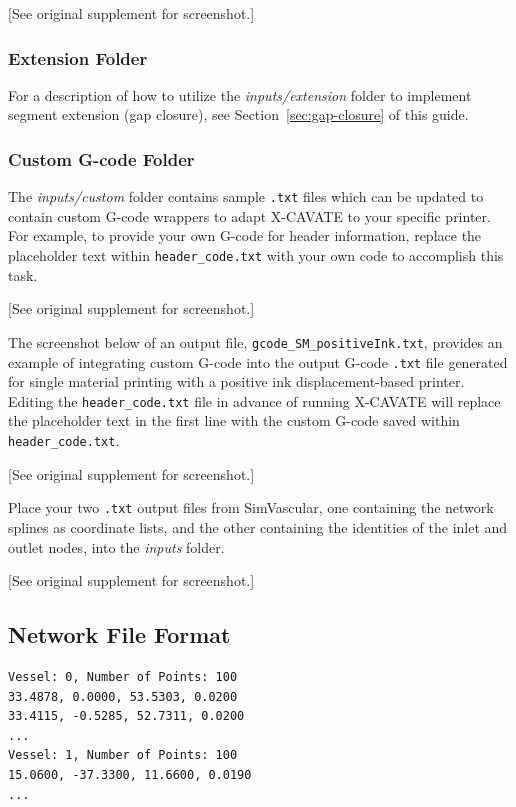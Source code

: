 \documentclass[11pt,letterpaper]{article}
\newcommand{\code}[1]{\texttt{#1}}
\begin{document}
[See original supplement for screenshot.]

\subsubsection{Extension Folder}

For a description of how to utilize the \textit{inputs/extension} folder to
implement segment extension (gap closure), see Section~\ref{sec:gap-closure}
of this guide.

\subsubsection{Custom G-code Folder}

The \textit{inputs/custom} folder contains sample \code{.txt} files which can
be updated to contain custom G-code wrappers to adapt X-CAVATE to your
specific printer. For example, to provide your own G-code for header
information, replace the placeholder text within \code{header\_code.txt} with
your own code to accomplish this task.

[See original supplement for screenshot.]

The screenshot below of an output file, \code{gcode\_SM\_positiveInk.txt},
provides an example of integrating custom G-code into the output G-code
\code{.txt} file generated for single material printing with a positive ink
displacement-based printer. Editing the \code{header\_code.txt} file in
advance of running X-CAVATE will replace the placeholder text in the first
line with the custom G-code saved within \code{header\_code.txt}.

[See original supplement for screenshot.]

Place your two \code{.txt} output files from SimVascular, one containing the
network splines as coordinate lists, and the other containing the identities of
the inlet and outlet nodes, into the \textit{inputs} folder.

[See original supplement for screenshot.]

\subsection{Network File Format}

\begin{lstlisting}
Vessel: 0, Number of Points: 100
33.4878, 0.0000, 53.5303, 0.0200
33.4115, -0.5285, 52.7311, 0.0200
...
Vessel: 1, Number of Points: 100
15.0600, -37.3300, 11.6600, 0.0190
...
\end{lstlisting}
\end{document}
